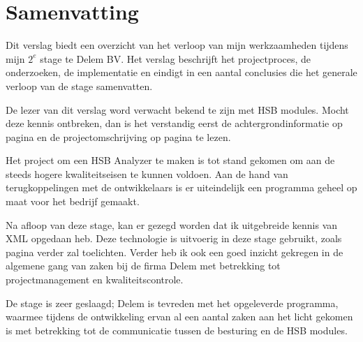 \chapter{Samenvatting}

Dit verslag biedt een overzicht van het verloop van mijn werkzaamheden tijdens mijn $2^e$ stage te Delem BV. Het verslag beschrijft het projectproces, de onderzoeken, de implementatie en eindigt in een aantal conclusies die het generale verloop van de stage samenvatten.

De lezer van dit verslag word verwacht bekend te zijn met HSB modules. Mocht deze kennis ontbreken, dan is het verstandig eerst de achtergrondinformatie op pagina \pageref{achtergrondinfo} en de projectomschrijving op pagina \pageref{project} te lezen.

Het project om een HSB Analyzer te maken is tot stand gekomen om aan de steeds hogere kwaliteitseisen te kunnen voldoen. Aan de hand van terugkoppelingen met de ontwikkelaars is er uiteindelijk een programma geheel op maat voor het bedrijf gemaakt.

Na afloop van deze stage, kan er gezegd worden dat ik uitgebreide kennis van XML opgedaan heb. Deze technologie is uitvoerig in deze stage gebruikt, zoals pagina \pageref{definitie} verder zal toelichten. Verder heb ik ook een goed inzicht gekregen in de algemene gang van zaken bij de firma Delem met betrekking tot projectmanagement en kwaliteitscontrole.

De stage is zeer geslaagd; Delem is tevreden met het opgeleverde programma, waarmee tijdens de ontwikkeling ervan al een aantal zaken aan het licht gekomen is met betrekking tot de communicatie tussen de besturing en de HSB modules.
